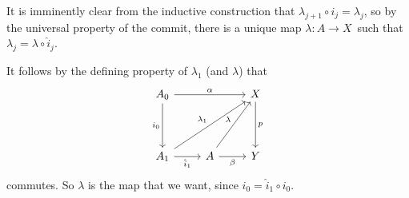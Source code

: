 \begin{exercise}[1]
\begin{enumerate}
It is imminently clear from the inductive construction that $\lambda_{j+1}
\circ i_j = \lambda_j$, so by the universal property of the commit, 
there is a unique map $\lambda : A \to X$ such that 
$\lambda_j = \lambda \circ \hat i_j$.

It follows by the defining property of $\lambda_1$ (and $\lambda$) that 
\[ \begin{tikzcd}[row sep = 4em]
A_0 \ar[rr,"\alpha"] \ar[d, "i_0"'] &
& X \ar[d, "p"] \\
A_1 \ar[r, "\hat i_1"'] \ar[rru, "\lambda_1"]
& A \ar[r, "\beta"'] \ar[ru, "\lambda"]
& Y
\end{tikzcd} \]
commutes. So $\lambda$ is the map that we want, since $\hat i_0 = \hat i_1
\circ i_0$.
\end{enumerate}
\end{exercise}


